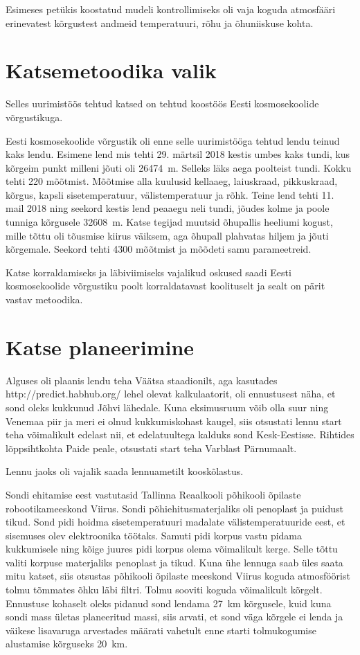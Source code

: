 \documentclass{trkut}%
\begin{document}
Esimeses petükis koostatud mudeli kontrollimiseks oli vaja koguda atmosfääri erinevatest kõrgustest andmeid temperatuuri, rõhu ja õhuniiskuse kohta.

\section{Katsemetoodika valik}
Selles uurimistöös tehtud katsed on tehtud koostöös Eesti kosmosekoolide võrgustikuga.

Eesti kosmosekoolide võrgustik oli enne selle uurimistööga tehtud lendu teinud kaks lendu. Esimene lend mis tehti 29. märtsil 2018 kestis umbes kaks tundi, kus kõrgeim punkt milleni jõuti oli \SI{26474}{m}. Selleks läks aega poolteist tundi. Kokku tehti 220 mõõtmist. Mõõtmise alla kuulusid kellaaeg, laiuskraad, pikkuskraad, kõrgus, kapsli sisetemperatuur, välistemperatuur ja rõhk. Teine lend tehti 11. mail 2018 ning seekord kestis lend peaaegu neli tundi, jõudes kolme ja poole tunniga kõrgusele \SI{32608}{m}. Katse tegijad muutsid õhupallis heeliumi kogust, mille tõttu oli tõusmise kiirus väiksem, aga õhupall plahvatas hiljem ja jõuti kõrgemale. Seekord tehti 4300 mõõtmist ja mõõdeti samu parameetreid.

Katse korraldamiseks ja läbiviimiseks vajalikud oskused saadi Eesti kosmosekoolide võrgustiku poolt korraldatavast koolituselt ja sealt on pärit vastav metoodika.

\section{Katse planeerimine}
Alguses oli plaanis lendu teha Väätsa staadionilt, aga kasutades http://predict.habhub.org/ lehel olevat kalkulaatorit, oli ennustusest näha, et sond oleks kukkunud Jõhvi lähedale. Kuna eksimusruum võib olla suur ning Venemaa piir ja meri ei olnud kukkumiskohast kaugel, siis otsustati lennu start teha võimalikult edelast nii, et edelatuultega kalduks sond Kesk-Eestisse. Rihtides lõppsihtkohta Paide peale, otsustati start teha Varblast Pärnumaalt.

Lennu jaoks oli vajalik saada lennuametilt kooskõlastus.

Sondi ehitamise eest vastutasid Tallinna Reaalkooli põhikooli õpilaste robootikameeskond Viirus. Sondi põhiehitusmaterjaliks oli penoplast ja puidust tikud. Sond pidi hoidma sisetemperatuuri madalate välistemperatuuride eest, et sisemuses olev elektroonika töötaks. Samuti pidi korpus vastu pidama kukkumisele ning kõige juures pidi korpus olema võimalikult kerge. Selle tõttu valiti korpuse materjaliks penoplast ja tikud. Kuna ühe lennuga saab üles saata mitu katset, siis otsustas põhikooli õpilaste meeskond Viirus koguda atmosföörist tolmu tõmmates õhku läbi filtri. Tolmu sooviti koguda võimalikult kõrgelt. Ennustuse kohaselt oleks pidanud sond lendama \SI{27}{km} kõrgusele, kuid kuna sondi mass ületas planeeritud massi, siis arvati, et sond väga kõrgele ei lenda ja väikese lisavaruga arvestades määrati vahetult enne starti tolmukogumise alustamise kõrguseks \SI{20}{km}.
\end{document}
